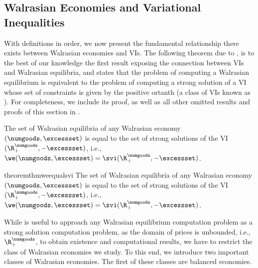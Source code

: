 \fi 
% 


\subsection{Walrasian Economies and Variational Inequalities}

With definitions in order, we now present the fundamental relationship there exists between Walrasian economies and VIs.
The following theorem due to \citet{dafermos1990exchange}, is to the best of our knowledge the first result exposing the connection between VIs and Walrasian equilibria, and states that the problem of computing a Walrasian equilibrium is equivalent to the problem of computing a strong solution of a VI whose set of constraints is given by the positive ortanth (a class of VIs known as  \cite{cottle1968complementary}). For completeness, we include its proof, as well as all other omitted results and proofs of this section in .

\begin{theorem}\label{thm:we_equal_svi}
    The set of Walrasian equilibria of any Walrasian economy $(\numgoods, \excessset)$ is equal to the set of strong solutions of the VI $(\R^\numgoods_+, -\excessset)$, i.e., $\we(\numgoods, \excessset) = \svi(\R^\numgoods_+, -\excessset)$.
\end{theorem}
\fi

\begin{restatable}{theorem}{thmweequalsvi}\label{thm:we_equal_svi}
    The set of Walrasian equilibria of any Walrasian economy $(\numgoods, \excessset)$ is equal to the set of strong solutions of the VI $(\R^\numgoods_+, -\excessset)$, i.e., $\we(\numgoods, \excessset) = \svi(\R^\numgoods_+, -\excessset)$.
\end{restatable}


While  is useful to approach any Walrasian equilibrium computation problem as a strong solution computation problem, as the domain of prices is unbounded, i.e., $\R^\numgoods_+$, to obtain existence and computational results, we have to restrict the class of Walrasian economies we study. To this end, we introduce two important classes of Walrasian economies. The first of these classes are balanced economies. 

